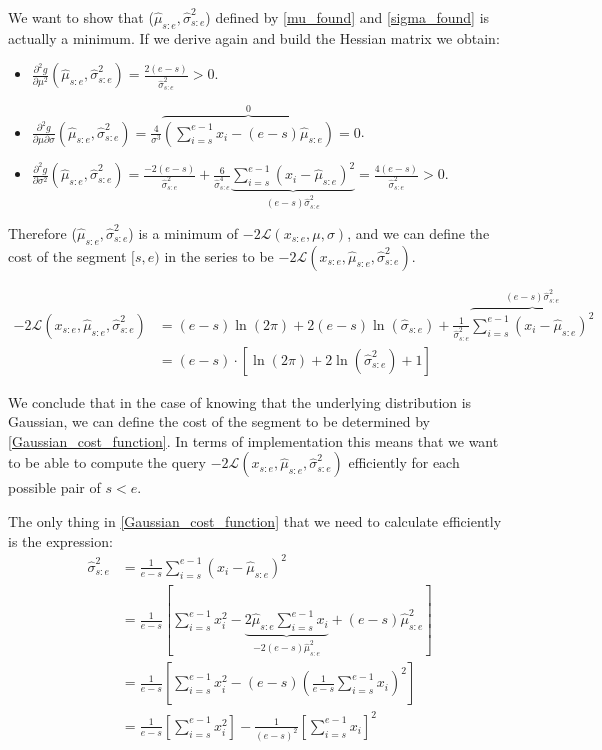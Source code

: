 \documentclass[pdflatex,sn-mathphys]{sn-jnl}%
\theoremstyle{thmstyleone}%
\theoremstyle{thmstyletwo}%
\theoremstyle{thmstylethree}%
\begin{document}
We want to show that ($\hat{\mu}_{s:e}, \hat{\sigma}^2_{s:e}$) defined by \ref{mu_found} and \ref{sigma_found} is actually a minimum. If we derive again and build the Hessian matrix we obtain: 
\begin{itemize}
    \item $\frac{\partial^2 g}{\partial \mu^2} (\hat{\mu}_{s:e}, \hat{\sigma}^2_{s:e}) = \frac{2(e-s)}{\hat{\sigma}^2_{s:e}} > 0$.
    \item $\frac{\partial^2 g}{\partial \mu \partial \sigma}(\hat{\mu}_{s:e}, \hat{\sigma}^2_{s:e}) = \frac{4}{\sigma^3} \overbrace{\left ( \sum\limits_{i=s}^{e-1} x_i - (e-s)\hat{\mu}_{s:e}\right )}^{0} = 0$.
    \item $\frac{\partial^2 g}{\partial\sigma^2} (\hat{\mu}_{s:e}, \hat{\sigma}^2_{s:e}) = \frac{-2(e-s)}{\hat{\sigma}^2_{s:e}} + \frac{6}{\hat{\sigma}^4_{s:e}}\underbrace{\sum\limits_{i=s}^{e-1}(x_i-\hat{\mu}_{s:e})^2}_{(e-s)\hat{\sigma}^2_{s:e}} = \frac{4(e-s)}{\hat{\sigma}^2_{s:e}} > 0.$ 
\end{itemize}

Therefore ($\hat{\mu}_{s:e}, \hat{\sigma}^2_{s:e}$) is a minimum of $-2\mathcal{L}(x_{s:e}, \mu, \sigma)$, and we can define the cost of the segment $[s,e)$ in the series to be $-2\mathcal{L}(x_{s:e}, \hat{\mu}_{s:e}, \hat{\sigma}^2_{s:e})$.

\begin{align}
    -2\mathcal{L}(x_{s:e}, \hat{\mu}_{s:e}, \hat{\sigma}^2_{s:e}) & = (e-s)\ln(2\pi) + 2(e-s)\ln(\hat{\sigma}_{s:e}) + \frac{1}{\hat{\sigma}^2_{s:e}} \overbrace{ \sum\limits_{i=s}^{e-1}(x_i- \hat{\mu}_{s:e})^2}^{(e-s)\hat{\sigma}^2_{s:e}} \nonumber \\
    & = (e-s) \cdot \left [ \ln(2\pi) + 2\ln(\hat{\sigma}^2_{s:e}) + 1 \right ] 
    \label{Gaussian_cost_function}
\end{align}

We conclude that in the case of knowing that the underlying distribution is Gaussian, we can define the cost of the segment to be determined by \ref{Gaussian_cost_function}. In terms of implementation this means that we want to be able to compute the query $-2\mathcal{L}(x_{s:e}, \hat{\mu}_{s:e}, \hat{\sigma}^2_{s:e})$ efficiently for each possible pair of $s < e$.

The only thing in \ref{Gaussian_cost_function} that we need to calculate efficiently is the expression: 
\begin{align}
     \hat{\sigma}^2_{s:e} & = \frac{1}{e-s}\sum\limits_{i=s}^{e-1}(x_i - \hat{\mu}_{s:e})^2 \nonumber \\ & = \frac{1}{e-s}\left [ \sum\limits_{i=s}^{e-1}x_i^2 - \underbrace{2\hat{\mu}_{s:e}\sum\limits_{i=s}^{e-1} x_i}_{-2(e-s)\hat{\mu}^2_{s:e}} + (e-s)\hat{\mu}_{s:e}^2 \right ] \nonumber \\ & = \frac{1}{e-s} \left [ \sum\limits_{i=s}^{e-1}x_i^2 -   (e-s) \left ( \frac{1}{e-s} \sum\limits_{i=s}^{e-1} x_i \right )^2 \right ] \nonumber \\
     & = \frac{1}{e-s} \left [ \sum\limits_{i=s}^{e-1}x_i^2 \right ] -  \frac{1}{(e-s)^2} \left [   \sum\limits_{i=s}^{e-1} x_i \right ]^2 
     \label{Gaussian_cost_expression}
\end{align}
\end{document}
